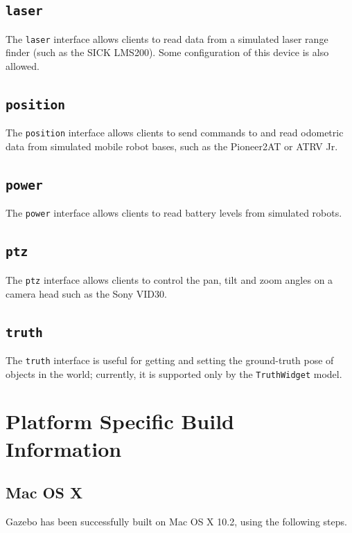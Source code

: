 \documentclass[11pt]{report}
\newcommand{\newinterface}[1]{\newpage \section{{\tt #1}}}
\begin{document}



\newinterface{laser}

The {\tt laser} interface allows clients to read data from a simulated
laser range finder (such as the SICK LMS200).  Some configuration of
this device is also allowed.




\newinterface{position}

The {\tt position} interface allows clients to send commands to and
read odometric data from simulated mobile robot bases, such as the
Pioneer2AT or ATRV Jr.




\newinterface{power}

The {\tt power} interface allows clients to read battery levels from
simulated robots.




\newinterface{ptz}

The {\tt ptz} interface allows clients to control the pan, tilt and
zoom angles on a camera head such as the Sony VID30.




\newinterface{truth}

The {\tt truth} interface is useful for getting and setting the
ground-truth pose of objects in the world; currently, it is supported
only by the {\tt TruthWidget} model.






\appendix

\chapter{Platform Specific Build Information}

\section{Mac OS X}

Gazebo has been successfully built on Mac OS X 10.2, using the
following steps.
\end{document}
